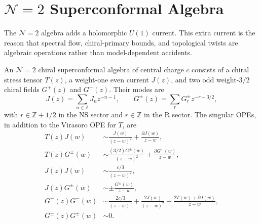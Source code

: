 \section{\texorpdfstring{\(\mathcal N=2\)}{N=2} Superconformal Algebra}

The \(\mathcal N=2\) algebra adds a holomorphic \(U(1)\) current.  This extra
current is the reason that spectral flow, chiral-primary bounds, and
topological twists are algebraic operations rather than model-dependent
accidents.

\begin{definition}[\(\mathcal N=2\) chiral superconformal algebra]
\label{def:n2-superconformal-algebra}
An \(\mathcal N=2\) chiral superconformal algebra of central charge \(c\)
consists of a chiral stress tensor \(T(z)\), a weight-one even current
\(J(z)\), and two odd weight-\(3/2\) chiral fields \(G^+(z)\) and \(G^-(z)\).
Their modes are
\[
  J(z)=\sum_{n\in\mathbb Z}J_n z^{-n-1},
  \qquad
  G^\pm(z)=\sum_r G^\pm_r z^{-r-3/2},
\]
with \(r\in\mathbb Z+1/2\) in the NS sector and \(r\in\mathbb Z\) in the R
sector.  The singular OPEs, in addition to the Virasoro OPE for \(T\), are
\begin{align}
  T(z)J(w)
  &\sim
  \frac{J(w)}{(z-w)^2}
  +\frac{\partial J(w)}{z-w},
  \label{eq:n2-tj-ope}\\
  T(z)G^\pm(w)
  &\sim
  \frac{(3/2)G^\pm(w)}{(z-w)^2}
  +\frac{\partial G^\pm(w)}{z-w},
  \label{eq:n2-tg-ope}\\
  J(z)J(w)
  &\sim
  \frac{c/3}{(z-w)^2},
  \label{eq:n2-jj-ope}\\
  J(z)G^\pm(w)
  &\sim
  \pm\frac{G^\pm(w)}{z-w},
  \label{eq:n2-jg-ope}\\
  G^+(z)G^-(w)
  &\sim
  \frac{2c/3}{(z-w)^3}
  +\frac{2J(w)}{(z-w)^2}
  +\frac{2T(w)+\partial J(w)}{z-w},
  \label{eq:n2-gplus-gminus-ope}\\
  G^\pm(z)G^\pm(w)&\sim0.
  \label{eq:n2-same-sign-g-ope}
\end{align}
\end{definition}

